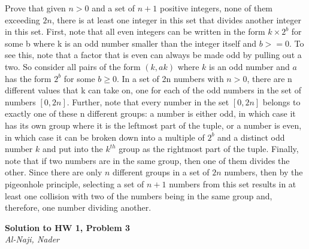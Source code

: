 \documentclass[12pt]{article}
\newcommand{\myhwtitle}[3]
{\begin{center}
{\large {\bf Solution to HW {#1}, Problem {#2}}}\\
\medskip 
{\it {#3}} %
\end{center}}
\begin{document}
Prove that given $n > 0$ and a set of $n+1$ positive integers, none of them exceeding $2n$, there is at least one integer in this set that divides 
another integer in this set.
\newline
\newline
First, note that all even integers can be written in the form $k \times 2^b$ for some b where k is an odd number smaller than the integer itself and $b >= 0$. To see this, note that a factor that is even can always be made odd by pulling out a two. So consider all pairs of the form $(k, ak)$ where $k$ is an odd number and $a$ has the form $2^b$ for some $b \geq 0$. In a set of 2n numbers with $n > 0$, there are
n different values that k can take on, one for each of the odd numbers in the set of numbers $[0,2n]$. Further, note that every number in the set $[0,2n]$ belongs to exactly one of
these n different groups: a number is either odd, in which case it has its own group where it is the leftmost part of the tuple, or a number is even, in which case it can be broken down
into a multiple of $2^b$ and a distinct odd number $k$ and put into the $k^{th}$ group as the rightmost part of the tuple. Finally, note that if two numbers are in the same
group, then one of them divides the other. Since there are only $n$ different groups in a set of $2n$ numbers, then by the pigeonhole principle, selecting a set of $n+1$ numbers from
this set results in at least one collision with two of the numbers being in the same group and, therefore, one number dividing another. 

\newpage
\myhwtitle{1}{3}{Al-Naji, Nader}

\bigskip
\end{document}
